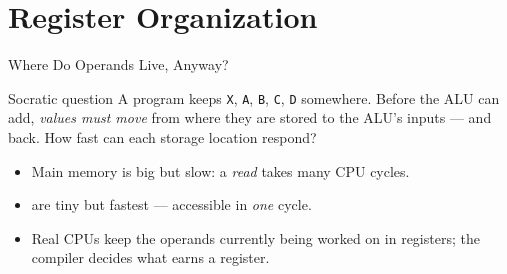 \documentclass[aspectratio=169]{beamer}
\begin{document}

\section{Register Organization}

\begin{frame}{Where Do Operands Live, Anyway?}
  \begin{block}{Socratic question}
    A program keeps \texttt{X}, \texttt{A}, \texttt{B}, \texttt{C}, \texttt{D}
    somewhere. Before the ALU can add, \emph{values must move} from where they
    are stored to the ALU's inputs --- and back. How fast can each storage
    location respond?
  \end{block}
  \begin{itemize}
    \item Main memory is big but slow: a \emph{read} takes many CPU cycles.
    \item {} are tiny but fastest --- accessible in \emph{one}
      cycle.
    \item Real CPUs keep the operands currently being worked on in registers;
      the compiler decides what earns a register.
  \end{itemize}
\end{frame}
\end{document}

